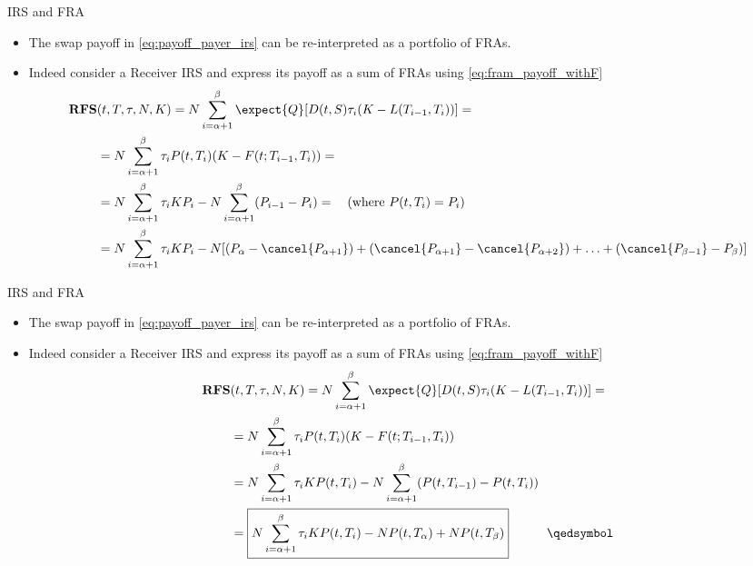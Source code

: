 \documentclass{beamer}
\begin{document}
\begin{frame}{IRS and FRA}
	\begin{itemize}
		\item The swap payoff in \cref{eq:payoff_payer_irs} can be re-interpreted as a portfolio of FRAs.
		\item Indeed consider a Receiver IRS and express its payoff as a sum of FRAs using \cref{eq:fram_payoff_withF}
		\begin{equation*}
			\begin{aligned}
				\textbf{RFS}&(t,T,\tau,N,K) = N\sum_{i=\alpha+1}^{\beta}\expect{Q}[D(t,S)\tau_i(K - L(T_{i-1},T_i))]=\\
				&=N\sum_{i=\alpha+1}^{\beta}\tau_i P(t,T_i)(K-F(t;T_{i-1},T_i))=\\
				&=N\sum_{i=\alpha+1}^{\beta}\tau_i KP_i-N\sum_{i=\alpha+1}^{\beta}(P_{i-1}-P_i)=\quad (\text{where }P(t, T_i) = P_i) \\
				&=N\sum_{i=\alpha+1}^{\beta}\tau_i KP_i-N[(P_\alpha -\cancel{P_{\alpha+1}}) + (\cancel{P_{\alpha+1}} - \cancel{P_{\alpha+2}}) + \ldots + (\cancel{P_{\beta-1}} - P_{\beta})] \\
			\end{aligned}
		\end{equation*}
	\end{itemize}
\end{frame}

\begin{frame}{IRS and FRA}
	\begin{itemize}
		\item The swap payoff in \cref{eq:payoff_payer_irs} can be re-interpreted as a portfolio of FRAs.
		\item Indeed consider a Receiver IRS and express its payoff as a sum of FRAs using \cref{eq:fram_payoff_withF}
		\begin{equation}
			\begin{aligned}
				\textbf{RFS}&(t,T,\tau,N,K) = 	N\sum_{i=\alpha+1}^{\beta}\expect{Q}[D(t,S)\tau_i(K - L(T_{i-1},T_i))]=\\
				&=N\sum_{i=\alpha+1}^{\beta}\tau_i P(t,T_i)(K-F(t;T_{i-1},T_i))\\
				&=N\sum_{i=\alpha+1}^{\beta}\tau_i KP(t,T_i)-N\sum_{i=\alpha+1}^{\beta}(P(t,T_{i-1})-P(t,T_i)) \\
				&=\boxed{N\sum_{i=\alpha+1}^{\beta}\tau_i KP(t,T_i)-NP(t,T_\alpha)+NP(t,T_\beta)}\quad\quad\quad\qedsymbol
			\end{aligned}
		\label{eq:swap_as_sum_fra}
		\end{equation}
	\end{itemize}
\end{frame}
\end{document}
